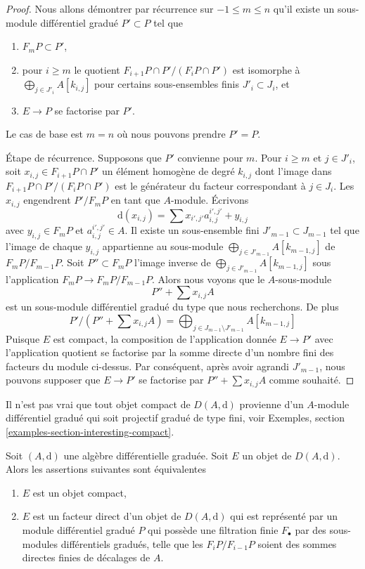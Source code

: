 \begin{proof}
Nous allons démontrer par récurrence sur $-1 \leq m \leq n$ qu'il
existe un sous-module différentiel gradué $P' \subset P$ tel que
\begin{enumerate}
\item $F_mP \subset P'$,
\item pour $i \geq m$ le quotient $F_{i + 1}P \cap P'/(F_iP \cap P')$ est
isomorphe à $\bigoplus_{j \in J'_i} A[k_{i, j}]$ pour certains sous-ensembles
finis $J'_i \subset J_i$, et
\item $E \to P$ se factorise par $P'$.
\end{enumerate}
Le cas de base est $m = n$ où nous pouvons prendre $P' = P$.

\medskip\noindent
Étape de récurrence. Supposons que $P'$
convienne pour $m$. Pour $i \geq m$ et $j \in J'_i$, soit $x_{i, j} \in F_{i +
1}P \cap P'$ un élément homogène de degré $k_{i, j}$ dont l'image
dans $F_{i + 1}P \cap P'/(F_iP \cap P')$ est le générateur du
facteur correspondant à $j \in J_i$. Les $x_{i, j}$
engendrent $P'/F_mP$ en tant que $A$-module. Écrivons
$$
\text{d}(x_{i, j}) = \sum x_{i', j'} a_{i, j}^{i', j'} + y_{i, j}
$$
avec $y_{i, j} \in F_mP$ et $a_{i, j}^{i', j'} \in A$. Il
existe un sous-ensemble fini
$J'_{m - 1} \subset J_{m - 1}$ tel que l'image de chaque $y_{i, j}$
appartienne au sous-module $\bigoplus_{j \in J'_{m - 1}} A[k_{m - 1, j}]$ de
$F_mP/F_{m - 1}P$. Soit $P'' \subset F_mP$ l'image inverse de
$\bigoplus_{j \in J'_{m - 1}} A[k_{m - 1, j}]$ sous l'application
$F_mP \to F_mP/F_{m - 1}P$. Alors nous voyons que le $A$-sous-module
$$
P'' + \sum x_{i, j}A
$$
est un sous-module différentiel gradué du type que nous recherchons. De plus
$$
P'/(P'' + \sum x_{i, j}A) =
\bigoplus\nolimits_{j \in J_{m - 1} \setminus J'_{m - 1}} A[k_{m - 1, j}]
$$
Puisque $E$ est compact, la composition de l'application donnée $E \to P'$ avec
l'application quotient se factorise par la somme directe d'un nombre fini des
facteurs du module ci-dessus. Par conséquent, après avoir agrandi $J'_{m - 1}$,
nous pouvons supposer que $E \to P'$ se factorise
par $P'' + \sum x_{i, j}A$ comme souhaité.
\end{proof}

\noindent
Il n'est pas vrai que tout objet compact de $D(A, \text{d})$ provienne
d'un $A$-module différentiel gradué qui soit projectif gradué de type
fini, voir Exemples, section \ref{examples-section-interesting-compact}.

\begin{proposition}
\label{proposition-compact}
Soit $(A, \text{d})$ une algèbre différentielle graduée. Soit $E$ un objet
de $D(A, \text{d})$. Alors les assertions suivantes sont équivalentes
\begin{enumerate}
\item $E$ est un objet compact,
\item $E$ est un facteur direct d'un objet de $D(A, \text{d})$ qui est
représenté par un module différentiel gradué $P$ qui possède une
filtration finie $F_\bullet$ par des sous-modules différentiels gradués, telle que
les $F_iP/F_{i - 1}P$ soient des sommes directes finies de décalages de $A$.
\end{enumerate}
\end{proposition}

